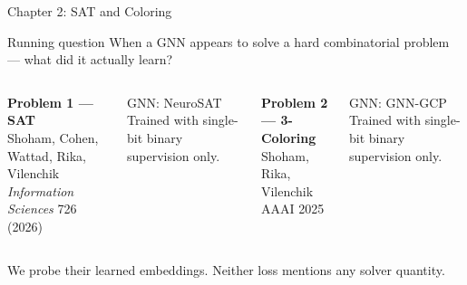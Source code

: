 \documentclass[aspectratio=169,10pt,dvipsnames]{beamer}
\begin{document}
\begin{frame}{Chapter 2: SAT and Coloring}

\begin{block}{Running question}
When a GNN appears to solve a hard combinatorial problem — what did it actually learn?
\end{block}

\bigskip
\begin{columns}[T]
\textbf{Problem 1 — SAT}\\
\small Shoham, Cohen, Wattad, Rika, Vilenchik\\
\textit{Information Sciences} 726 (2026)

\medskip
GNN: NeuroSAT\\
Trained with single-bit binary supervision only.

\textbf{Problem 2 — 3-Coloring}\\
\small Shoham, Rika, Vilenchik\\
AAAI 2025

\medskip
GNN: GNN-GCP\\
Trained with single-bit binary supervision only.
\end{columns}

\bigskip
\small\color{bgucolor} We probe their learned embeddings. Neither loss mentions any solver quantity.

\end{frame}
\end{document}
